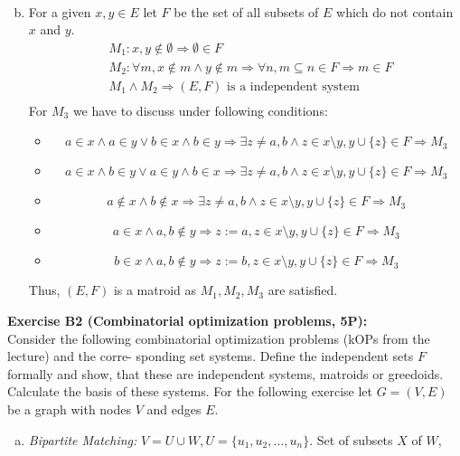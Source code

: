 \documentclass[12pt]{article}
\theoremstyle{definition}
\begin{document}
\begin{flushleft}
\begin{enumerate}[(a)]
\begin{align*}
    \end{align*}
    \item For a given $x, y \in E$ let $F$ be the set of all subsets of $E$ which do not contain $x$ and $y$.
    \begin{align*}
        &M_1 : x,y \not\in \emptyset \Longrightarrow \emptyset \in F \\
        &M_2 : \forall m, x \not\in m \land y \not\in m \Longrightarrow \forall n, m \subseteq n \in F \Longrightarrow m \in F \\
        &M_1 \land M_2 \Longrightarrow (E,F) \text{ is a independent system} \\
    \end{align*}
    \newline
    For $M_3$ we have to discuss under following conditions:
    \begin{itemize}
        \item $$a \in x \land a \in y \lor b \in x \land b\in y \Longrightarrow \exists z \not = a,b \land z \in x \setminus y, y \cup \{z\} \in F \Longrightarrow M_3$$
        \item $$a \in x \land b \in y \lor a \in y \land b \in x \Longrightarrow \exists z \not = a,b \land z \in x \setminus y, y \cup \{z\} \in F \Longrightarrow M_3$$
        \item $$ a \not\in x \land b \not\in x \Longrightarrow \exists z \not = a,b \land z \in x \setminus y, y \cup \{z\} \in F \Longrightarrow M_3$$ 
        \item $$ a \in x \land a,b \not\in y \Longrightarrow z := a, z \in x \setminus y, y \cup \{z\} \in F \Longrightarrow M_3$$
        \item $$ b \in x \land a,b \not\in y \Longrightarrow z := b, z \in x \setminus y, y \cup \{z\} \in F \Longrightarrow M_3$$
    \end{itemize}
    Thus, $(E,F)$ is a matroid as $M_1, M_2, M_3$ are satisfied.
\end{enumerate}
\newpage
\textbf{Exercise B2 (Combinatorial optimization problems, 5P):} \\
Consider the following combinatorial optimization problems (kOPs from the lecture) and the corre-
sponding set systems. Define the independent sets $F$ formally and show, that these are independent
systems, matroids or greedoids. Calculate the basis of these systems. For the following exercise let
$G = (V,E)$ be a graph with nodes $V$ and edges $E$.
\begin{enumerate}[(a)]
    \item \textit{Bipartite Matching:} $V = U \cup W, U = \{u_1, u_2, \ldots, u_n\}$. Set of subsets $X$ of $W$, 

\end{enumerate}
\end{flushleft}
\end{document}
